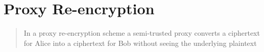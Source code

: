 \section{Proxy Re-encryption}

\begin{quote}
  In a proxy re-encryption scheme a semi-trusted proxy converts a ciphertext for Alice into a ciphertext for Bob without seeing the underlying plaintext \autocite{greenateniese:2006:paper}
\end{quote}
